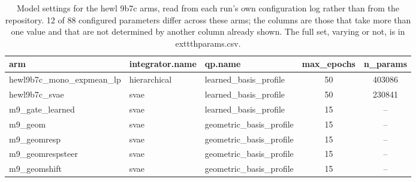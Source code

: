 \begin{table}[htbp]
\centering
\caption{Model settings for the hewl 9b7c arms, read from each run's own configuration log rather than from the repository. 12 of 88 configured parameters differ across these arms; the columns are those that take more than one value and that are not determined by another column already shown. The full set, varying or not, is in 	exttt{hparams.csv}.}
\label{tab:hyperparameters_hewl_9b7c}
\small
\begin{tabular}{@{}l l l S[table-format=2.0] S[table-format=6.0]@{}}
\toprule
{arm} & {integrator.name} & {qp.name} & {max\_epochs} & {n\_params} \\
\midrule
{hewl9b7c\_mono\_expmean\_lp} & {hierarchical} & {learned\_basis\_profile} & 50 & 403086 \\
{hewl9b7c\_svae} & {svae} & {learned\_basis\_profile} & 50 & 230841 \\
{m9\_gate\_learned} & {svae} & {learned\_basis\_profile} & 15 & {--} \\
{m9\_geom} & {svae} & {geometric\_basis\_profile} & 15 & {--} \\
{m9\_geomresp} & {svae} & {geometric\_basis\_profile} & 15 & {--} \\
{m9\_geomrespsteer} & {svae} & {geometric\_basis\_profile} & 15 & {--} \\
{m9\_geomshift} & {svae} & {geometric\_basis\_profile} & 15 & {--} \\
\bottomrule
\end{tabular}
\end{table}
